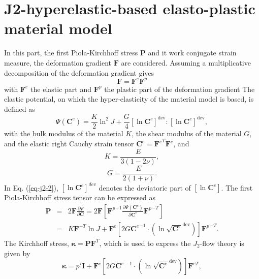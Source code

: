 \chapter{J2-hyperelastic-based elasto-plastic material model}\label{app-j2}
In this part, the first Piola-Kirchhoff stress $ \textbf{P} $ and it work conjugate strain measure, the deformation gradient $ \textbf{F} $ are considered. Assuming a multiplicative decomposition of the deformation gradient gives
\begin{equation}\label{eq-j2-1}
\textbf{F}={\textbf{F} }^e {\textbf{F} }^p
\end{equation}
with $ \textbf{F}^e $ the elastic part and $ \textbf{F}^p $ the plastic part of the deformation gradient The elastic potential, on which the hyper-elasticity of the material model is based, is defined as
\begin{equation}\label{eq-j2-2}
\Psi({\textbf{C}}^e)=\frac{K}{2}\ln^2J+\frac{G}{4}[\ln{\textbf{C}}^e]^{\text{dev}}:[\ln{\textbf{C}}^e]^{\text{dev}},
\end{equation}
with the bulk modulus of the material $ K $, the shear modulus of the material $ G $, and the elastic right Cauchy strain tensor $ {\textbf{C}}^e={\textbf{F}^e}^T{\textbf{F}^e} $, and 
\begin{equation}\label{eq-j2-1-1}
K = \frac{E}{3(1-2\nu)},
\end{equation}
\begin{equation}\label{eq-j2-1-2}
G=\frac{E}{2(1+\nu)}.
\end{equation}
In Eq. (\ref{eq-j2-2}), $ \left[\ln{\textbf{C}}^e\right]^{dev} $ denotes the deviatoric part of $ \left[\ln{\textbf{C}}^e\right] $. The first Piola-Kirchhoff stress tensor can be expressed as 
\begin{eqnarray}
\textbf{P} & = & 2\textbf{F}\frac{\partial\Psi}{\partial\textbf{C}}=2\textbf{F}\left[{{\textbf{F}}^p}^{-1}\frac{\partial\Psi(\textbf{C}^e)}{\partial\textbf{C}^e}{{\textbf{F}}^p}^{-T}\right]\nonumber\\
& = & K\textbf{F}^{-T}\ln J+\textbf{F}^e\left[2G{\textbf{C}^e}^{-1}\cdot\left(\ln\sqrt{\textbf{C}^e}^\text{dev}\right)\right]{\textbf{F}^p}^{-T}.
\end{eqnarray}
The Kirchhoff stress, $ \boldsymbol\kappa=\textbf{P}\textbf{F}^T $, which is used to express the $ J_2 $-flow theory is given by
\begin{equation}\label{eq-j2-3}
\boldsymbol\kappa=p'\textbf{I}+\textbf{F}^e\left[2G{\textbf{C}}^{e-1}\cdot\left(\ln\sqrt{{\textbf{C}}^e}^\text{dev}\right)\right]\textbf{F}^{eT},
\end{equation}
